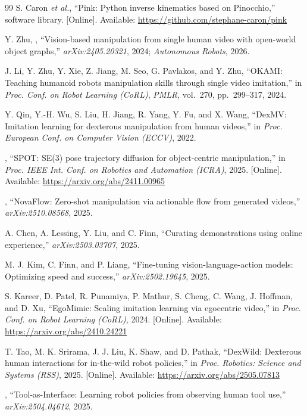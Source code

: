 \begin{thebibliography}{99}
S. Caron \emph{et al.}, ``Pink: Python inverse kinematics based on Pinocchio,''
software library. [Online]. Available:
\url{https://github.com/stephane-caron/pink}

Y. Zhu, \ph{[et al.]}, ``Vision-based manipulation from single human video with
open-world object graphs,'' \emph{arXiv:2405.20321}, 2024; \emph{Autonomous
Robots}, 2026. 

J. Li, Y. Zhu, Y. Xie, Z. Jiang, M. Seo, G. Pavlakos, and Y. Zhu, ``OKAMI:
Teaching humanoid robots manipulation skills through single video imitation,''
in \emph{Proc. Conf. on Robot Learning (CoRL)}, \emph{PMLR}, vol.~270,
pp.~299--317, 2024.

Y. Qin, Y.-H. Wu, S. Liu, H. Jiang, R. Yang, Y. Fu, and X. Wang, ``DexMV:
Imitation learning for dexterous manipulation from human videos,'' in
\emph{Proc. European Conf. on Computer Vision (ECCV)}, 2022.

\ph{[Authors]}, ``SPOT: SE(3) pose trajectory diffusion for object-centric
manipulation,'' in \emph{Proc. IEEE Int. Conf. on Robotics and Automation
(ICRA)}, 2025. [Online]. Available: \url{https://arxiv.org/abs/2411.00965}

\ph{[Authors]}, ``NovaFlow: Zero-shot manipulation via actionable flow from
generated videos,'' \emph{arXiv:2510.08568}, 2025.

A. Chen, A. Lessing, Y. Liu, and C. Finn, ``Curating demonstrations using
online experience,'' \emph{arXiv:2503.03707}, 2025.

M. J. Kim, C. Finn, and P. Liang, ``Fine-tuning vision-language-action models:
Optimizing speed and success,'' \emph{arXiv:2502.19645}, 2025.

S. Kareer, D. Patel, R. Punamiya, P. Mathur, S. Cheng, C. Wang, J. Hoffman, and
D. Xu, ``EgoMimic: Scaling imitation learning via egocentric video,'' in
\emph{Proc. Conf. on Robot Learning (CoRL)}, 2024. [Online]. Available:
\url{https://arxiv.org/abs/2410.24221}

T. Tao, M. K. Srirama, J. J. Liu, K. Shaw, and D. Pathak, ``DexWild: Dexterous
human interactions for in-the-wild robot policies,'' in \emph{Proc. Robotics:
Science and Systems (RSS)}, 2025. [Online]. Available:
\url{https://arxiv.org/abs/2505.07813}

\ph{[Authors]}, ``Tool-as-Interface: Learning robot policies from observing
human tool use,'' \emph{arXiv:2504.04612}, 2025.


\end{thebibliography}
